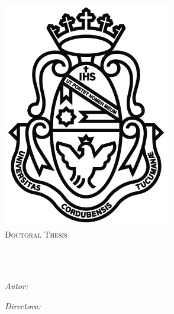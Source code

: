 \documentclass[
11pt, %
english, %
onehalfspacing, %
nolistspacing, %
headsepline, %
consistentlayout, %
]{MastersDoctoralThesis} %
\author{Cristian \textsc{Cardellino}} %
\begin{document}
\frontmatter %

\pagestyle{plain} %


\begin{titlepage}
\begin{center}

{\scshape\LARGE \univname\\\facname\par}\vspace{0.5cm} %
\includegraphics[scale=0.4]{images/logounc.jpg}\\[0.4cm] %
\textsc{\Large Doctoral Thesis}\\[0.2cm] %

\HRule \\[0.4cm] %
{\huge \bfseries \ttitle\par}\vspace{0.4cm} %
\HRule \\[1cm] %
 
\begin{minipage}[t]{0.4\textwidth}
\begin{flushleft} \large
\emph{Autor:}\\
\href{https://crscardellino.github.io}{\authorname} %
\end{flushleft}
\end{minipage}
\begin{minipage}[t]{0.4\textwidth}
\begin{flushright} \large
\emph{Directora:} \\
\href{https://cs.famaf.unc.edu.ar/~laura/}{\supname} %
\end{flushright}
\end{minipage}\\[1cm]


\end{center}
\end{titlepage}
\end{document}
